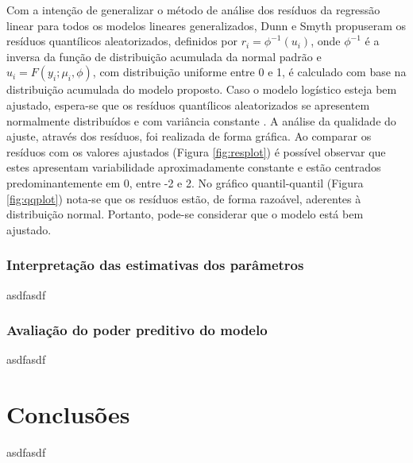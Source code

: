 \documentclass[twocolumn]{rbef}
\newcommand{\1}{\mathbbm{1}}
\begin{document}
Com a intenção de generalizar o método de análise dos resíduos da regressão linear para todos os modelos lineares generalizados, Dunn e Smyth \cite{Dunn1996} propuseram os resíduos quantílicos aleatorizados, definidos por \(r_i = \phi^{-1}(u_i)\), onde \(\phi^{-1}\) é a inversa da função de distribuição acumulada da normal padrão e \(u_i = F(y_i;\mu_i,\phi)\), com distribuição uniforme entre 0 e 1, é calculado com base na distribuição acumulada do modelo proposto. Caso o modelo logístico esteja bem ajustado, espera-se que os resíduos quantílicos aleatorizados se apresentem normalmente distribuídos e com variância constante \cite{Taconeli2015}. A análise da qualidade do ajuste, através dos resíduos, foi realizada de forma gráfica. Ao comparar os resíduos com os valores ajustados (Figura \ref{fig:resplot}) é possível observar que estes apresentam variabilidade aproximadamente constante e estão centrados predominantemente em 0, entre -2 e 2. No gráfico quantil-quantil \cite{Wilk1968} (Figura \ref{fig:qqplot}) nota-se que os resíduos estão, de forma razoável, aderentes à distribuição normal. Portanto, pode-se considerar que o modelo está bem ajustado.

\hypertarget{interpretauxe7uxe3o-das-estimativas-dos-paruxe2metros}{%
\subsubsection{Interpretação das estimativas dos parâmetros}\label{interpretauxe7uxe3o-das-estimativas-dos-paruxe2metros}}

asdfasdf

\hypertarget{avaliauxe7uxe3o-do-poder-preditivo-do-modelo}{%
\subsubsection{Avaliação do poder preditivo do modelo}\label{avaliauxe7uxe3o-do-poder-preditivo-do-modelo}}

asdfasdf

\hypertarget{conclusuxf5es}{%
\section{Conclusões}\label{conclusuxf5es}}

asdfasdf



\end{document}
